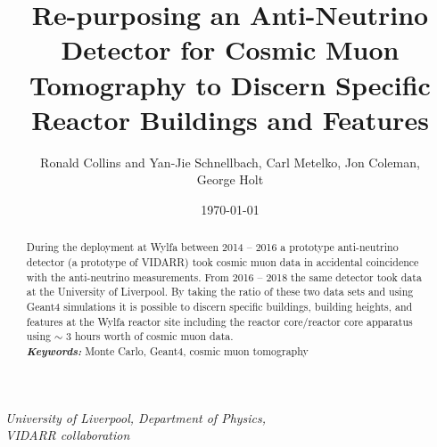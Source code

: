 \documentclass[12pt,a4paper]{article}
\title{Re-purposing an Anti-Neutrino Detector for Cosmic Muon Tomography to Discern Specific Reactor Buildings and Features}
\date{\today}
\author{Ronald Collins and Yan-Jie Schnellbach, Carl Metelko, Jon Coleman, \\George Holt}
\begin{document}
\maketitle


\begin{center}
\textit{University of Liverpool, Department of Physics,\\}
\textit{VIDARR collaboration\\}
\end{center}
 

\begin{abstract}
\normalsize During the deployment at Wylfa between 2014 -- 2016 a prototype anti-neutrino detector (a prototype of VIDARR) took cosmic muon data in accidental coincidence with the anti-neutrino measurements. From 2016 -- 2018 the same detector took data at the University of Liverpool. By taking the ratio of these two data sets and using Geant4 simulations it is possible to discern specific buildings, building heights, and features at the Wylfa reactor site including the reactor core/reactor core apparatus using $\sim$ 3 hours worth of cosmic muon data.\\

\providecommand{\keywords}[1]{\textbf{\textit{Keywords:}} #1} %
\keywords{Monte Carlo, Geant4, cosmic muon tomography}
\end{abstract}
\vspace{5mm} %


\end{document}
